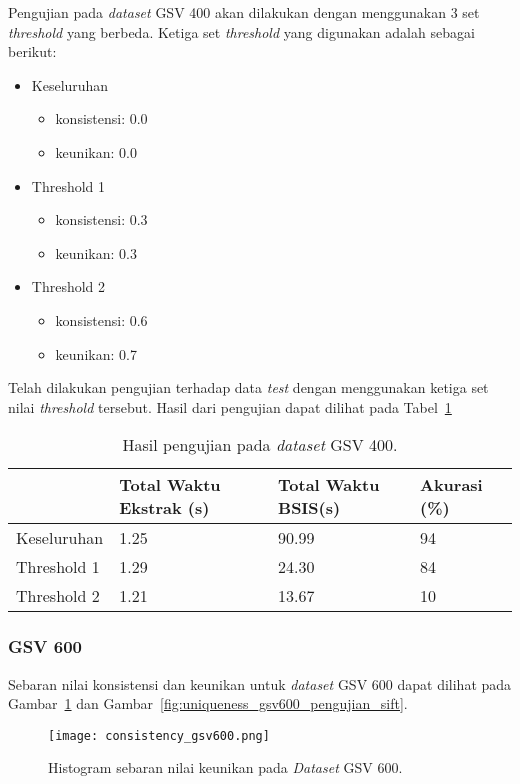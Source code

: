 Pengujian pada \textit{dataset} GSV 400 akan dilakukan dengan menggunakan 3 set \textit{threshold} yang berbeda. Ketiga set \textit{threshold} yang digunakan adalah sebagai berikut:
\begin{itemize}
	\item Keseluruhan
	\begin{itemize}
		\item konsistensi: 0.0
		\item keunikan: 0.0
	\end{itemize}
	\item Threshold 1
	\begin{itemize}
		\item konsistensi: 0.3
		\item keunikan: 0.3
	\end{itemize}
	\item Threshold 2
	\begin{itemize}
		\item konsistensi: 0.6
		\item keunikan: 0.7
	\end{itemize}
\end{itemize}
Telah dilakukan pengujian terhadap data \textit{test} dengan menggunakan ketiga set nilai \textit{threshold} tersebut. Hasil dari pengujian dapat dilihat pada Tabel~\ref{tab:pengujian_sift_gsv400}
\begin{table}[H]
	\centering
	\begin{tabular}{|l|l|l|l|}
		\hline
		& \textbf{Total Waktu Ekstrak (s)} & \textbf{Total Waktu BSIS(s)} & \textbf{Akurasi (\%)} \\ \hline
		Keseluruhan & 1.25	&	90.99                    & 94                    \\ \hline
		Threshold 1 & 1.29	&	24.30                    & 84                    \\ \hline
		Threshold 2 & 1.21	&	13.67                    & 10                    \\ \hline
	\end{tabular}
	\caption{Hasil pengujian pada \textit{dataset} GSV 400.}
	\label{tab:pengujian_sift_gsv400}
\end{table}

\subsubsection{GSV 600}
Sebaran nilai konsistensi dan keunikan untuk \textit{dataset} GSV 600 dapat dilihat pada Gambar~\ref{fig:consistency_gsv600_pengujian_sift} dan Gambar~\ref{fig:uniqueness_gsv600_pengujian_sift}.
\begin{figure}[H]
	\centering
	\texttt{[image: consistency\_gsv600.png]}
	\caption{Histogram sebaran nilai keunikan pada \textit{Dataset} GSV 600.}
	\label{fig:consistency_gsv600_pengujian_sift}
\end{figure}

